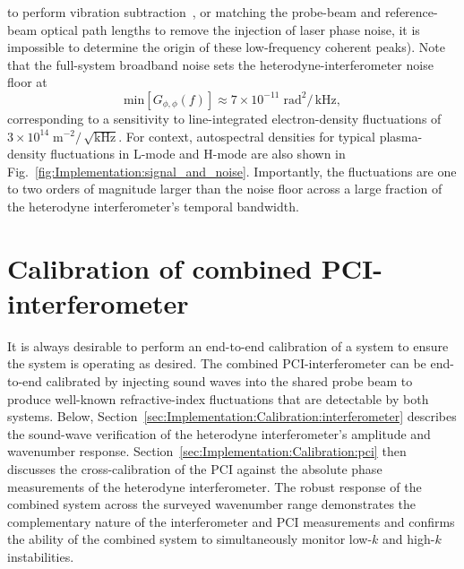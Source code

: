 to perform vibration subtraction~\cite{carlstrom_rsi88}, or
matching the probe-beam and reference-beam optical path lengths
to remove the injection of laser phase noise,
it is impossible to determine the origin
of these low-frequency coherent peaks).
Note that the full-system broadband noise
sets the heterodyne-interferometer noise floor at
\begin{equation}
  \text{min} \left[ G_{\phi,\phi}(f) \right]
  \approx
  7 \times 10^{-11} \; \text{rad}^2 / \, \text{kHz},
  \label{eq:Implementation:noise_floor_rad2_per_Hz}
\end{equation}
corresponding to a sensitivity
to line-integrated electron-density fluctuations of
$3 \times 10^{14} \; \text{m}^{-2} / \, \sqrt{\text{kHz}}$.
For context, autospectral densities for typical plasma-density fluctuations
in L-mode and H-mode are also shown in
Fig.~\ref{fig:Implementation:signal_and_noise}.
Importantly, the fluctuations are one to two
orders of magnitude larger than the noise floor
across a large fraction of the heterodyne interferometer's temporal bandwidth.


\section{Calibration of combined PCI-interferometer}
\label{sec:Implementation:Calibration}
It is always desirable to perform an end-to-end calibration of a system
to ensure the system is operating as desired.
The combined PCI-interferometer can be end-to-end calibrated
by injecting sound waves into the shared probe beam
to produce well-known refractive-index fluctuations
that are detectable by both systems.
Below, Section~\ref{sec:Implementation:Calibration:interferometer}
describes the sound-wave verification of
the heterodyne interferometer's amplitude and wavenumber response.
Section~\ref{sec:Implementation:Calibration:pci}
then discusses the cross-calibration of the PCI
against the absolute phase measurements
of the heterodyne interferometer.
The robust response of the combined system
across the surveyed wavenumber range
demonstrates the complementary nature
of the interferometer and PCI measurements and
confirms the ability of the combined system
to simultaneously monitor low-$k$ and high-$k$ instabilities.


